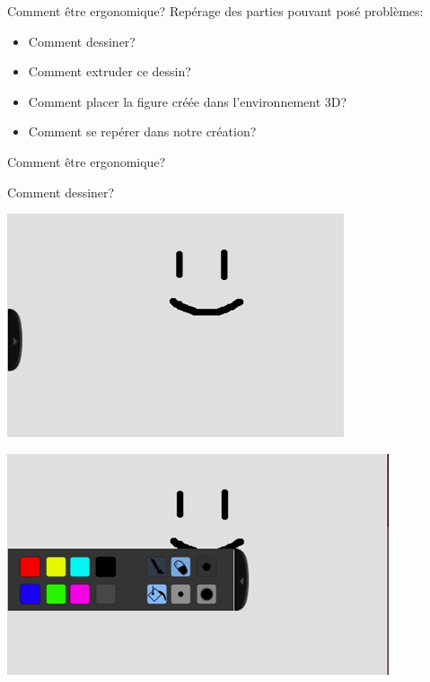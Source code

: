 \documentclass[a4paper,10pt]{beamer}
\begin{document}
		
		\begin{frame}{Comment être ergonomique?}
				Repérage des parties pouvant posé problèmes:
				
				\begin{itemize}
					\item Comment dessiner?
					\item Comment extruder ce dessin?
					\item Comment placer la figure créée dans l'environnement 3D?
					\item Comment se repérer dans notre création?
				\end{itemize}
		\end{frame}	
		
		\begin{frame}{Comment être ergonomique?}

				Comment dessiner?
				\centerline{\includegraphics[scale=0.3]{images/Nono/img1.png}}
				\centerline{\includegraphics[scale=0.3]{images/Nono/img2.png}}

		\end{frame}	
	
\end{document}
